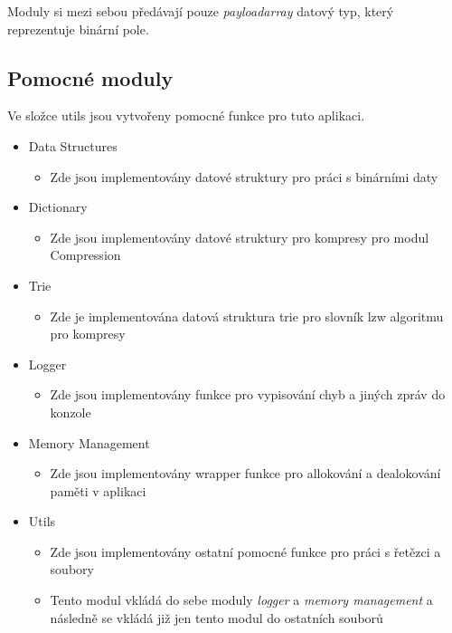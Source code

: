 \documentclass[12pt]{report}
\begin{document}
    Moduly si mezi sebou předávají pouze \textit{payloadarray} datový typ, který reprezentuje binární pole.
   
\subsection{Pomocné moduly}
    Ve složce utils jsou vytvořeny pomocné funkce pro tuto aplikaci.
    \begin{itemize}
        \item Data Structures
        \begin{itemize}
            \item Zde jsou implementovány datové struktury pro práci s binárními daty
        \end{itemize}
        \item Dictionary
        \begin{itemize}
            \item Zde jsou implementovány datové struktury pro kompresy pro modul Compression
        \end{itemize}
        \item Trie
        \begin{itemize}
            \item Zde je implementována datová struktura trie pro slovník lzw algoritmu pro kompresy
        \end{itemize}
        \item Logger
        \begin{itemize}
            \item Zde jsou implementovány funkce pro vypisování chyb a jiných zpráv do konzole
        \end{itemize}
        \item Memory Management
        \begin{itemize}
            \item Zde jsou implementovány wrapper funkce pro allokování a dealokování paměti v aplikaci
        \end{itemize}
        \item Utils
        \begin{itemize}
            \item Zde jsou implementovány ostatní pomocné funkce pro práci s řetězci a soubory
        \end{itemize}
        \begin{itemize}
            \item Tento modul vkládá do sebe moduly \textit{logger} a \textit{memory management} a následně se vkládá již jen tento modul do ostatních souborů
        \end{itemize}
    \end{itemize}
\end{document}
